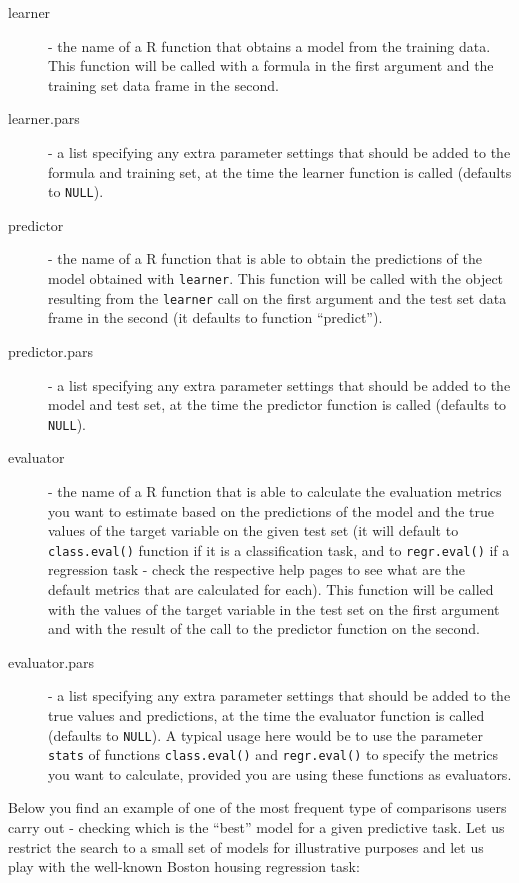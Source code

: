 \documentclass[10pt,a4paper]{article}\usepackage[]{graphicx}\usepackage[]{color}
\begin{document}
\begin{description}
\item[learner] - the name of a R function that obtains a model from the training data. This function will be called with a formula in the first argument and the training set data frame in the second.
\item[learner.pars] - a list specifying any extra parameter settings that should be added to the formula and training set, at the time the learner function is called (defaults to \texttt{NULL}).
\item[predictor] - the name of a R function that is able to obtain the predictions of the model obtained with \texttt{learner}. This function will be called with the object resulting from the \texttt{learner} call on the first argument and the test set data frame in the second (it defaults to function ``predict'').
\item[predictor.pars] - a list specifying any extra parameter settings that should be added to the model and test set, at the time the predictor function is called (defaults to \texttt{NULL}).
\item[evaluator] - the name of a R function that is able to calculate the evaluation metrics you want to estimate based on the predictions of the model and the true values of the target variable on the given test set (it will default to \texttt{class.eval()} function if it is a classification task, and to \texttt{regr.eval()} if a regression task - check the respective help pages to see what are the default metrics that are calculated for each). This function will be called with the values of the target variable in the test set on the first argument and with the result of the call to the predictor function on the second.
\item[evaluator.pars] -  a list specifying any extra parameter settings that should be added to the true values and predictions, at the time the evaluator function is called (defaults to \texttt{NULL}). A typical usage here would be to use the parameter \texttt{stats} of functions \texttt{class.eval()} and \texttt{regr.eval()} to specify the metrics you want to calculate, provided you are using these functions as evaluators.
\end{description}


Below you find an example of one of the most frequent type of
comparisons users carry out - checking which is the ``best'' model for
a given predictive task. Let us restrict the search to a small set of
models for illustrative purposes and let us play with the well-known
Boston housing regression task:
\end{document}

